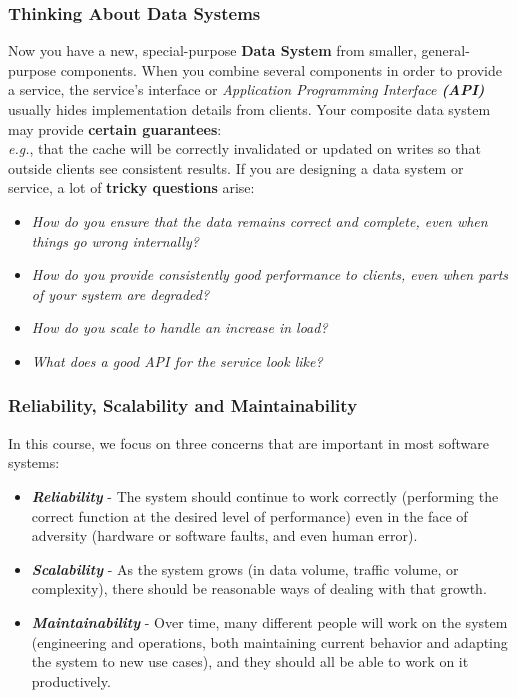 \documentclass{beamer}
\begin{document}
\begin{frame}\frametitle{Thinking About Data Systems}
\scriptsize
Now you have a new, special-purpose \textbf{Data System} from smaller, general-purpose components.
\vfill
When you combine several components in order to provide a service, the service's interface
or \emph{Application Programming Interface \textbf{(API)}} usually hides implementation details from clients.
\vfill
Your composite data system may provide \textbf{certain guarantees}: \\
\emph{e.g.}, that the cache will be correctly invalidated or updated on writes so that outside
clients see consistent results.
\vfill
If you are designing a data system or service, a lot of \textbf{tricky questions} arise:
\begin{itemize}
    \item\emph{How do you ensure that the data remains correct and complete,
    even when things go wrong internally?}\\
    \item\emph{How do you provide consistently good performance to clients,
    even when parts of your system are degraded?}\\
    \item\emph{How do you scale to handle an increase in load?}\\
    \item\emph{What does a good API for the service look like?}\\
\end{itemize}
\end{frame}

\begin{frame}\frametitle{Reliability, Scalability and Maintainability}
\scriptsize
In this course, we focus on three concerns that are important in most software systems:
\vfill
\begin{itemize}
    \item \textbf{\textit{Reliability}} - The system should continue to work correctly
    (performing the correct function at the desired level of performance) even in the
    face of adversity (hardware or software faults, and even human error). \vfill
    \item \textbf{\textit{Scalability}} - As the system grows (in data volume, traffic volume,
    or complexity), there should be reasonable ways of dealing with that growth. \vfill
    \item \textbf{\textit{Maintainability}} - Over time, many different people will work on the
    system (engineering and operations, both maintaining current behavior and adapting the system
    to new use cases), and they should all be able to work on it productively.
\end{itemize}
\end{frame}
\end{document}
